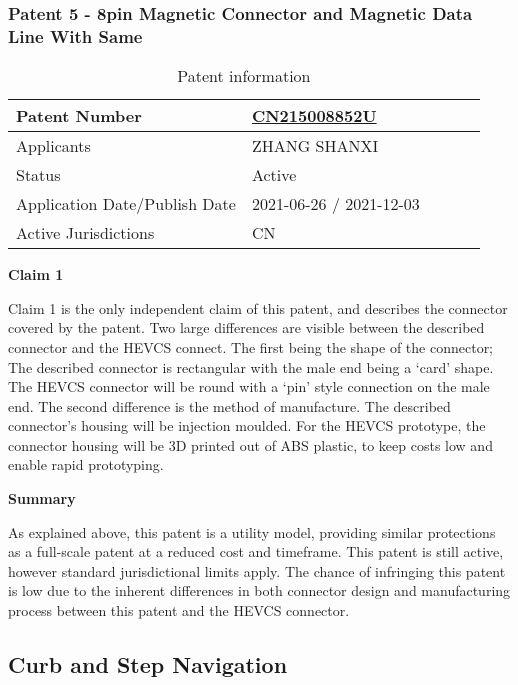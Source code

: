 \documentclass [12pt]{article}
\begin{document}
\subsubsection{Patent 5 - 8pin Magnetic Connector and Magnetic Data Line With Same}
\begin{table}[H]
    \centering
    \setlength{\arrayrulewidth}{1.5pt}
    \begin{tabular}{|p{0.5\linewidth}|p{0.5\linewidth}|}
    \hline
    Patent Number & \href{https://worldwide.espacenet.com/patent/search/family/079083033/publication/CN215008852U?q=CN215008852U}{CN215008852U}\\
    \hline
    Applicants &ZHANG SHANXI\\
    \hline
    Status & Active\\
    \hline
    Application Date/Publish Date & 2021-06-26 / 2021-12-03\\
    \hline
    Active Jurisdictions & CN\\
    \hline
    \end{tabular}
    \caption{Patent information}
    \label{table:mag_con5}
\end{table}
\textbf{Claim 1}

Claim 1 is the only independent claim of this patent, and describes the connector covered by the patent. Two large differences are visible between the described connector and the HEVCS connect. The first being the shape of the connector; The described connector is rectangular with the male end being a ‘card’ shape. The HEVCS connector will be round with a ‘pin’ style connection on the male end.
The second difference is the method of manufacture. The described connector’s housing will be injection moulded. For the HEVCS prototype, the connector housing will be 3D printed out of ABS plastic, to keep costs low and enable rapid prototyping. 

\textbf{Summary}

As explained above, this patent is a utility model, providing similar protections as a full-scale patent at a reduced cost and timeframe. This patent is still active, however standard jurisdictional limits apply. The chance of infringing this patent is low due to the inherent differences in both connector design and manufacturing process between this patent and the HEVCS connector.


\subsection{Curb and Step Navigation}\label{sec:curb_step_navigation}
\end{document}
